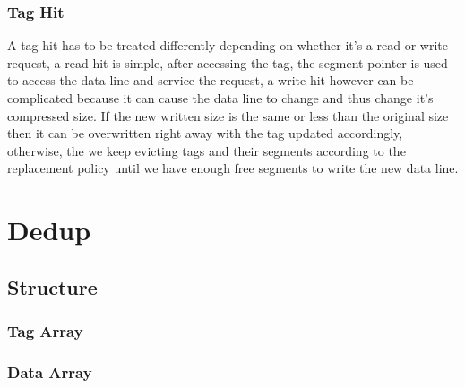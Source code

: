 \subsubsection{Tag Hit}
A tag hit has to be treated differently depending on whether it's a read or write request, a read hit is simple, after accessing the tag, the segment pointer is used to access the data line and service the request, a write hit however can be complicated because it can cause the data line to change and thus change it's compressed size. If the new written size is the same or less than the original size then it can be overwritten right away with the tag updated accordingly, otherwise, the we keep evicting tags and their segments according to the replacement policy until we have enough free segments to write the new data line.

\section{Dedup}
\label{sec:Dedup}
\subsection{Structure}
\label{ssec:DedupStructure}
\subsubsection{Tag Array}
\label{sssec:DedupTag}
\subsubsection{Data Array}
\label{sssec:DedupData}
